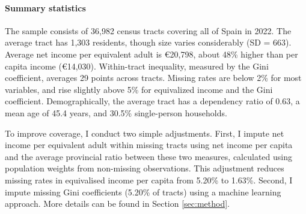 \paragraph{Summary statistics} The sample consists of 36,982 census tracts covering all of Spain in 2022. The average tract has 1,303 residents, though size varies considerably (SD = 663). Average net income per equivalent adult is €20,798, about 48\% higher than per capita income (€14,030). Within-tract inequality, measured by the Gini coefficient, averages 29 points across tracts. Missing rates are below 2\% for most variables, and rise slightly above 5\% for equivalized income and the Gini coefficient. Demographically, the average tract has a dependency ratio of 0.63, a mean age of 45.4 years, and 30.5\% single-person households.

\begin{table}[H]
\centering
{}
\end{table}

To improve coverage, I conduct two simple adjustments. First, I impute net income per equivalent adult within missing tracts using net income per capita and the average provincial ratio between these two measures, calculated using population weights from non-missing observations. This adjustment reduces missing rates in equivalised income per capita from 5.20\% to 1.63\%. Second, I impute missing Gini coefficients (5.20\% of tracts) using a machine learning approach. More details can be found in Section \ref{sec:method}.